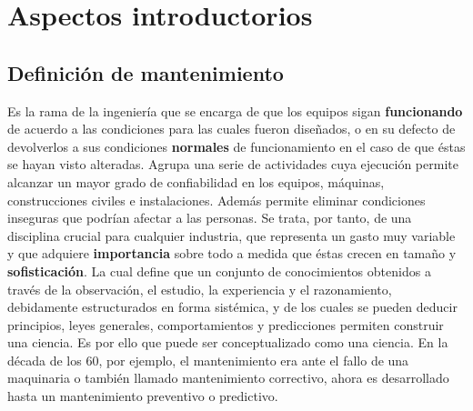 \documentclass[
	12pt, %
	fleqn, %
	a4paper, %
	oneside, %
]{LegrandOrangeBook}
\begin{document}
\chapter{Aspectos introductorios}
\section{Definición de mantenimiento}
Es la rama de la ingeniería que se encarga de que los equipos sigan \textbf{funcionando} de acuerdo a las condiciones para las cuales fueron diseñados, o en su defecto de devolverlos a sus condiciones \textbf{normales} de funcionamiento en el caso de que éstas se hayan visto alteradas. Agrupa una serie de actividades cuya ejecución permite alcanzar un mayor grado de confiabilidad en los equipos, máquinas, construcciones civiles e instalaciones. Además permite eliminar condiciones inseguras que podrían afectar a las personas. Se trata, por tanto, de una disciplina crucial para cualquier industria, que representa un gasto muy variable y que adquiere \textbf{importancia} sobre todo a medida que éstas crecen en tamaño y \textbf{sofisticación}. La cual define que un conjunto de conocimientos obtenidos a través de la observación, el estudio, la experiencia y el razonamiento, debidamente estructurados en forma sistémica, y de los cuales se pueden deducir principios, leyes generales, comportamientos y predicciones permiten construir una ciencia. Es por ello que puede ser conceptualizado como una ciencia. En la década de los 60, por ejemplo, el mantenimiento era ante el fallo de una maquinaria o también llamado mantenimiento correctivo, ahora es desarrollado hasta un mantenimiento preventivo o predictivo.
\end{document}
